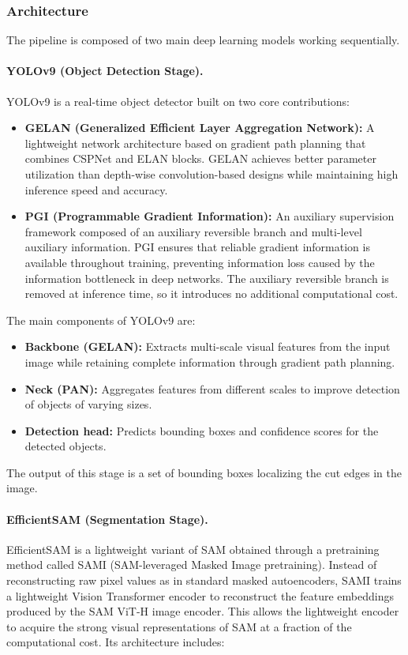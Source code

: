 \documentclass[11pt]{article}
\begin{document}
\subsubsection{Architecture}

The pipeline is composed of two main deep learning models working sequentially.

\paragraph{YOLOv9 (Object Detection Stage).}
YOLOv9 \cite{WangYOLOv92024} is a real-time object detector built on two core 
contributions:

\begin{itemize}
    \item \textbf{GELAN (Generalized Efficient Layer Aggregation Network):} A lightweight 
    network architecture based on gradient path planning that combines CSPNet and ELAN 
    blocks. GELAN achieves better parameter utilization than depth-wise convolution-based 
    designs while maintaining high inference speed and accuracy.
    \item \textbf{PGI (Programmable Gradient Information):} An auxiliary supervision 
    framework composed of an auxiliary reversible branch and multi-level auxiliary 
    information. PGI ensures that reliable gradient information is available throughout 
    training, preventing information loss caused by the information bottleneck in deep 
    networks. The auxiliary reversible branch is removed at inference time, so it 
    introduces no additional computational cost.
\end{itemize}

The main components of YOLOv9 are:
\begin{itemize}
    \item \textbf{Backbone (GELAN):} Extracts multi-scale visual features from the input 
    image while retaining complete information through gradient path planning.
    \item \textbf{Neck (PAN):} Aggregates features from different scales to improve 
    detection of objects of varying sizes.
    \item \textbf{Detection head:} Predicts bounding boxes and confidence scores for 
    the detected objects.
\end{itemize}

The output of this stage is a set of bounding boxes localizing the cut edges in 
the image.

\paragraph{EfficientSAM (Segmentation Stage).}
EfficientSAM \cite{XiongEfficientSAM2023} is a lightweight variant of SAM obtained 
through a pretraining method called SAMI (SAM-leveraged Masked Image pretraining). 
Instead of reconstructing raw pixel values as in standard masked autoencoders, SAMI 
trains a lightweight Vision Transformer encoder to reconstruct the feature embeddings 
produced by the SAM ViT-H image encoder. This allows the lightweight encoder to acquire 
the strong visual representations of SAM at a fraction of the computational cost. 
Its architecture includes:
\end{document}
